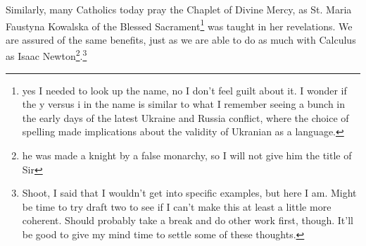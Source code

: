 \documentclass[12pt]{article}[titlepage]
\renewcommand{\,}{\textsuperscript{,}}
\begin{document}
Similarly, many Catholics today pray the Chaplet of Divine Mercy, as St. Maria Faustyna Kowalska of the Blessed Sacrament\footnote{yes I needed to look up the name, no I don't feel guilt about it. I wonder if the y versus i in the name is similar to what I remember seeing a bunch in the early days of the latest Ukraine and Russia conflict, where the choice of spelling made implications about the validity of Ukranian as a language.} was taught in her revelations.
We are assured of the same benefits, just as we are able to do as much with Calculus as Isaac Newton\footnote{he was made a knight by a false monarchy, so I will not give him the title of Sir}.\footnote{Shoot, I said that I wouldn't get into specific examples, but here I am. Might be time to try draft two to see if I can't make this at least a little more coherent. Should probably take a break and do other work first, though. It'll be good to give my mind time to settle some of these thoughts.}
\end{document}
